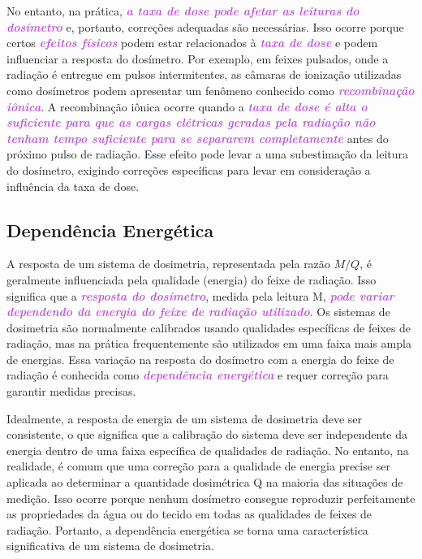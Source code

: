 \documentclass[11pt,a4paper]{article}
\newcounter{exemplo}
\begin{document}
	No entanto, na prática, \textcolor{MediumOrchid}{\textit{\textbf{a taxa de dose pode afetar as leituras do dosímetro}}} e, portanto, correções adequadas são necessárias. Isso ocorre porque certos \textcolor{MediumOrchid}{\textit{\textbf{efeitos físicos}}} podem estar relacionados à \textcolor{MediumOrchid}{\textit{\textbf{taxa de dose}}} e podem influenciar a resposta do dosímetro. Por exemplo, em feixes pulsados, onde a radiação é entregue em pulsos intermitentes, as câmaras de ionização utilizadas como dosímetros podem apresentar um fenômeno conhecido como \textcolor{MediumOrchid}{\textit{\textbf{recombinação iônica}}}. A recombinação iônica ocorre quando a \textcolor{MediumOrchid}{\textit{\textbf{taxa de dose é alta o suficiente para que as cargas elétricas geradas pela radiação não tenham tempo suficiente para se separarem completamente}}} antes do próximo pulso de radiação. Esse efeito pode levar a uma subestimação da leitura do dosímetro, exigindo correções específicas para levar em consideração a influência da taxa de dose.

\subsection*{Dependência Energética}

	A resposta de um sistema de dosimetria, representada pela razão $M/Q$, é geralmente influenciada pela qualidade (energia) do feixe de radiação. Isso significa que a \textcolor{MediumOrchid}{\textit{\textbf{resposta do dosímetro}}}, medida pela leitura M, \textcolor{MediumOrchid}{\textit{\textbf{pode variar dependendo da energia do feixe de radiação utilizado}}}. Os sistemas de dosimetria são normalmente calibrados usando qualidades específicas de feixes de radiação, mas na prática frequentemente são utilizados em uma faixa mais ampla de energias. Essa variação na resposta do dosímetro com a energia do feixe de radiação é conhecida como \textcolor{MediumOrchid}{\textit{\textbf{dependência energética}}} e requer correção para garantir medidas precisas.

	Idealmente, a resposta de energia de um sistema de dosimetria deve ser consistente, o que significa que a calibração do sistema deve ser independente da energia dentro de uma faixa específica de qualidades de radiação. No entanto, na realidade, é comum que uma correção para a qualidade de energia precise ser aplicada ao determinar a quantidade dosimétrica Q na maioria das situações de medição. Isso ocorre porque nenhum dosímetro consegue reproduzir perfeitamente as propriedades da água ou do tecido em todas as qualidades de feixes de radiação. Portanto, a dependência energética se torna uma característica significativa de um sistema de dosimetria.
\end{document}
